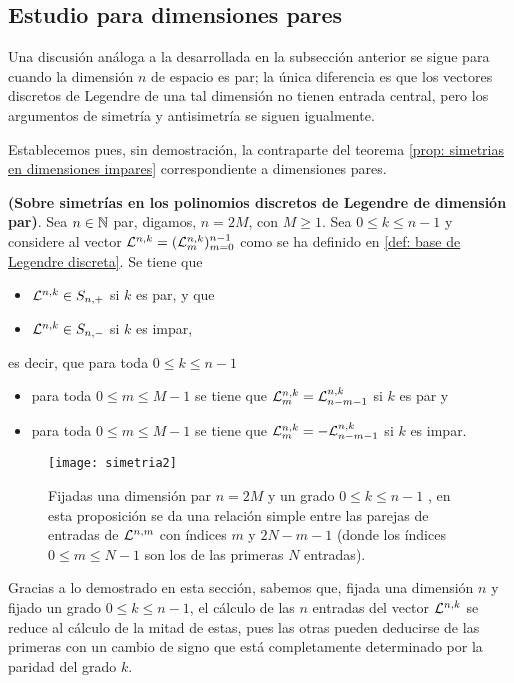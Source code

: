 \QEDB
\vspace{0.2cm}

\subsection{Estudio para dimensiones pares}
Una discusión análoga a la desarrollada en la subsección
anterior se sigue para cuando la dimensión $n$ de espacio
es par; la única diferencia es que los vectores discretos
de Legendre de una tal dimensión no tienen entrada central,
pero los argumentos de simetría y antisimetría se siguen
igualmente.

Establecemos pues, sin demostración, 
la contraparte del teorema
\ref{prop: simetrias en dimensiones impares} 
correspondiente a dimensiones pares.


\begin{teo}
\label{prop: simetrias en dimensiones pares}
\textbf{(Sobre simetrías
en los polinomios discretos de Legendre de dimensión par)}.
Sea $n \in \mathbb{N}$ par, digamos,
$n=2M$, con $M \geq 1$. Sea $0 \leq k \leq n-1$ y
considere al vector $\mathcal{L}^{n,k}=(\mathcal{L}^{n,k}_{m})_{m=0}^{n-1}$
como se ha definido en \eqref{def: base de Legendre discreta}.
Se tiene que 
\begin{itemize}
\item $\mathcal{L}^{n,k} \in S_{n,+}$ si $k$ es par, y que
\item $\mathcal{L}^{n,k} \in S_{n,-}$ si $k$ es impar,
\end{itemize}
es decir, que para toda $0 \leq k \leq n-1$ 

\begin{itemize}
\item para toda $0 \leq m \leq M-1$ se tiene que 
$\mathcal{L}^{n,k}_{m} = \mathcal{L}^{n,k}_{n-m-1}$ si $k$ es par y
\item para toda $0 \leq m \leq M-1$ 
se tiene que $\mathcal{L}^{n,k}_{m} = -\mathcal{L}^{n,k}_{n-m-1}$ si $k$ es impar.
\end{itemize}

\end{teo}
\begin{figure}[H]
\centering\captionsetup{format = hang}
	\begin{measuredfigure}
		\texttt{[image: simetria2]} 
		\caption{Fijadas una dimensión par $n=2M$ 
		y un grado $0 \leq k \leq n-1$ ,
		en esta proposición se da una relación simple entre las parejas 
		de entradas de $\mathcal{L}^{n,m}$ con índices $m$ y $2N-m-1$ 
		(donde los índices $0 \leq m \leq N-1$ son los de las primeras
		$N$ entradas).}
 	\end{measuredfigure}
 \end{figure}

Gracias a lo demostrado en esta sección, sabemos que,
fijada una dimensión $n$ y fijado un grado $0 \leq k \leq n-1$,
el cálculo de las $n$ entradas del vector $\mathcal{L}^{n,k}$
se reduce al cálculo de la mitad de estas, pues las otras pueden
deducirse de las primeras con un cambio de signo que está completamente
determinado por la paridad del grado $k$.